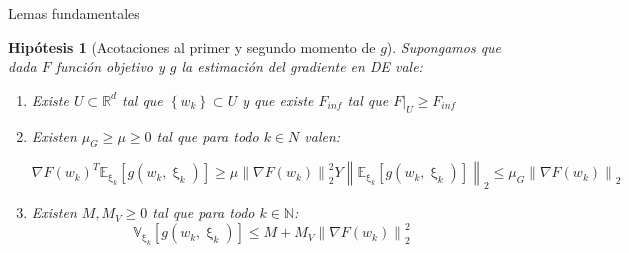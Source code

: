 \documentclass{beamer}
\newtheorem{hyp}[theorem]{Hip\'otesis}
\newcommand{\R}{{\mathbb{R}}}
\newcommand{\N}{{\mathbb{N}}}
\newcommand{\norm}[1]{\left\lVert#1\right\rVert}
\newcommand{\sett}[1]{\left\lbrace#1\right\rbrace}
\newcommand{\expectationsub}[2]{\mathbb{E}_{#1} \left[#2\right]}
\newcommand{\variancesub}[2]{\mathbb{V}_{#1} \left[#2\right]}
\newcommand{\expectationchik}[1]{\expectationsub{\upxi_{k}}{#1}}
\newcommand{\variancechik}[1]{\variancesub{\upxi_{k}}{#1}}
\begin{document}
\begin{frame}{Lemas fundamentales}



\begin{hyp}[Acotaciones al primer y segundo momento de $g$]
	Supongamos que dada $F$ funci\'on objetivo y $g$ la estimaci\'on del gradiente en DE vale:
	
	\begin{enumerate}
		\item Existe $U \subset \R^d$ tal que $\sett{w_k} \subset U$ y que existe $F_{inf}$ tal que $F\vert_U \geq F_{inf}$
		\item Existen $\mu_G \geq \mu \geq 0$ tal que para todo $k \in N$ valen:
		
		\begin{subequations}
			\begin{equation*}
			\nabla F(w_k)^T \expectationchik{g(w_k, \upxi_{k})} \geq \mu \norm{\nabla F(w_k)}_2^2
			\end{equation*}
			Y
			\begin{equation*}
			\norm{\expectationchik{g(w_k, \upxi_{k})}}_2 \leq \mu_G \norm{\nabla F(w_k)}_2
			\end{equation*}
		\end{subequations}
		\item 	Existen $M, M_V \geq 0$ tal que para todo $k \in \N$:
		\begin{equation*}
		\variancechik{g(w_k, \upxi_{k})} \leq M + M_V \norm{\nabla F (w_k)}_2^2
		\end{equation*}
		
	\end{enumerate}
	
\end{hyp}

\end{frame}
\end{document}
